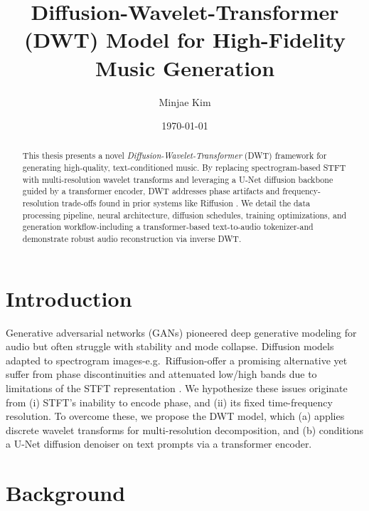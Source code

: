 \documentclass[12pt]{report}
\begin{document}
\title{Diffusion-Wavelet-Transformer (DWT) Model for High-Fidelity Music Generation}
\author{Minjae Kim}
\date{\today}
\maketitle

\begin{abstract}
This thesis presents a novel \emph{Diffusion-Wavelet-Transformer} (DWT) framework for generating high-quality, text-conditioned music. By replacing spectrogram‐based STFT with multi-resolution wavelet transforms and leveraging a U-Net diffusion backbone guided by a transformer encoder, DWT addresses phase artifacts and frequency-resolution trade-offs found in prior systems like Riffusion \cite{ForsgrenMartiros2022,Rombach2022}. We detail the data processing pipeline, neural architecture, diffusion schedules, training optimizations, and generation workflow-including a transformer-based text-to-audio tokenizer-and demonstrate robust audio reconstruction via inverse DWT.
\end{abstract}

\tableofcontents

\chapter{Introduction}

Generative adversarial networks (GANs) pioneered deep generative modeling for audio \cite{Goodfellow2014} but often struggle with stability and mode collapse. Diffusion models adapted to spectrogram images-e.g.\ Riffusion-offer a promising alternative yet suffer from phase discontinuities and attenuated low/high bands due to limitations of the STFT representation \cite{ForsgrenMartiros2022}\cite{Rombach2022}. We hypothesize these issues originate from (i) STFT’s inability to encode phase, and (ii) its fixed time-frequency resolution. To overcome these, we propose the DWT model, which (a) applies discrete wavelet transforms for multi-resolution decomposition, and (b) conditions a U-Net diffusion denoiser on text prompts via a transformer encoder.

\chapter{Background}
\end{document}
